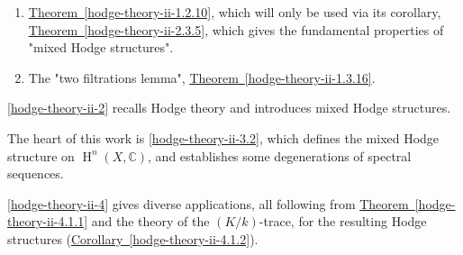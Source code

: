   
 \begin{enumerate}
    
 \item[(a)]
      \hyperref[hodge-theory-ii-1.2.10]{Theorem~\ref*{hodge-theory-ii-1.2.10}}, which will only be used via its corollary, \hyperref[hodge-theory-ii-2.3.5]{Theorem~\ref*{hodge-theory-ii-2.3.5}}, which gives the fundamental properties of "mixed Hodge structures".
    

    
 \item[(b)]
      The "two filtrations lemma", \hyperref[hodge-theory-ii-1.3.16]{Theorem~\ref*{hodge-theory-ii-1.3.16}}.
    

  \end{enumerate}\par{}\cref{hodge-theory-ii-2} recalls Hodge theory and introduces mixed Hodge structures.\par{}The heart of this work is \cref{hodge-theory-ii-3.2}, which defines the mixed Hodge structure on \(\operatorname {H}^n(X,\mathbb {C})\), and establishes some degenerations of spectral sequences.\par{}\cref{hodge-theory-ii-4} gives diverse applications, all following from \hyperref[hodge-theory-ii-4.1.1]{Theorem~\ref*{hodge-theory-ii-4.1.1}} and the theory of the \((K/k)\)-trace, for the resulting Hodge structures (\hyperref[hodge-theory-ii-4.1.2]{Corollary~\ref*{hodge-theory-ii-4.1.2}}).
